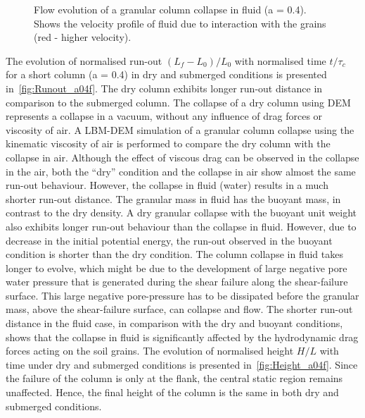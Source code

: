 \begin{figure}
\caption[Flow evolution of a granular column collapse in fluid (a = 0.4)]{Flow 
evolution of a granular column collapse in fluid (a = 0.4). Shows 
the velocity profile of fluid due to interaction with the grains (red - higher 
velocity).}
\label{fig:a04_snapshots}
\end{figure}


The evolution of normalised run-out $(L_f - L_0)/L_0$ with normalised time 
$t/\tau_c$ for a short column (a = 0.4) in dry and submerged conditions is 
presented in~\cref{fig:Runout_a04f}. The dry column exhibits longer run-out 
distance in comparison to the submerged column. The collapse of a dry column 
using DEM represents a collapse in a vacuum, without any influence of drag 
forces or viscosity of air. A LBM-DEM simulation of a granular column collapse 
using the kinematic viscosity of air is performed to compare the dry column 
with the collapse in air. Although the effect of viscous drag can be observed 
in the collapse in the air, both the ``dry'' condition and the 
collapse in air show almost the same run-out behaviour. However, the collapse 
in fluid (water) results in a much shorter run-out distance. The granular mass 
in fluid has the buoyant mass, in contrast to the dry density. A dry granular 
collapse with the buoyant unit weight also exhibits longer run-out behaviour 
than the collapse in fluid. However, due to 
decrease in the initial potential energy, the run-out observed in the buoyant 
condition is shorter than the dry condition. The column collapse in fluid takes 
longer to evolve, which might be due to the development 
of large negative pore water pressure that is generated during the shear 
failure along the shear-failure surface. This large negative pore-pressure has 
to be 
dissipated before the granular mass, above the shear-failure surface, can 
collapse 
and flow. The shorter run-out distance in the fluid case, in comparison with 
the dry and buoyant conditions, shows that the collapse in fluid is 
significantly affected by the hydrodynamic drag forces acting on the soil 
grains. The evolution of normalised height $H/L$ with time under dry and 
submerged conditions is presented in~\cref{fig:Height_a04f}. Since the 
failure of the column is only at the flank, the central static region remains 
unaffected. Hence, the final height of the column is the same in both dry and 
submerged conditions.

